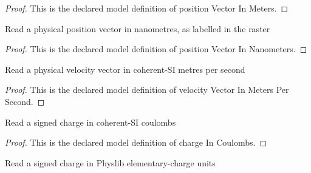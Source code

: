 \begin{proof}
  This is the declared model definition of position Vector In Meters.
\end{proof}
\begin{definition}
  \label{def:physics:phyx-mini-0959:phyxminiproblems-problemphyxmini0959-positionvectorinnanometers}
  Read a physical position vector in nanometres, as labelled in the raster
\end{definition}
\begin{proof}
  This is the declared model definition of position Vector In Nanometers.
\end{proof}
\begin{definition}
  \label{def:physics:phyx-mini-0959:phyxminiproblems-problemphyxmini0959-velocityvectorinmeterspersecond}
  Read a physical velocity vector in coherent-SI metres per second
\end{definition}
\begin{proof}
  This is the declared model definition of velocity Vector In Meters Per Second.
\end{proof}
\begin{definition}
  \label{def:physics:phyx-mini-0959:phyxminiproblems-problemphyxmini0959-chargeincoulombs}
  Read a signed charge in coherent-SI coulombs
\end{definition}
\begin{proof}
  This is the declared model definition of charge In Coulombs.
\end{proof}
\begin{definition}
  \label{def:physics:phyx-mini-0959:phyxminiproblems-problemphyxmini0959-chargeinelementarycharges}
  Read a signed charge in Physlib elementary-charge units
\end{definition}

